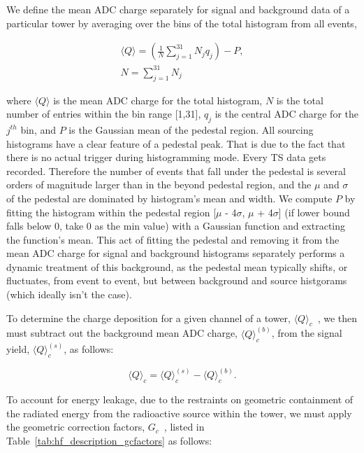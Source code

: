 We define the mean ADC charge separately for signal and background data of a
particular tower by averaging over the bins of the total histogram from all
events,

\begin{center}
   \begin{eqnarray}
      \label{eq:Histo_Avg}
      \langle{Q}\rangle = (\frac{1}{N} \sum\limits_{j=1}^{31} N_{j}q_{j}) - P, \\
      N = \sum\limits_{j=1}^{31} N_j \nonumber
   \end{eqnarray}
\end{center}

where $\langle{Q}\rangle$ is the mean ADC charge for the total histogram,
$N$ is the total number of entries within the bin range [1,31], $q_j$ is
the central ADC charge for the $j^{th}$ bin, and $P$ is the Gaussian mean of
the pedestal region. All sourcing histograms have a clear feature of a pedestal
peak. That is due to the fact that there is no actual trigger during
histogramming mode. Every TS data gets recorded. Therefore the number of events
that fall under the pedestal is several orders of magnitude larger than in the
beyond pedestal region, and the $\mu$ and $\sigma$ of the pedestal are dominated
by histogram's mean and width. We compute $P$ by fitting the histogram
within the pedestal region [$\mu$ - 4$\sigma$, $\mu$ + 4$\sigma$]
(if lower bound falls below 0, take 0 as the min value) with a Gaussian function
and extracting the function's mean. This act of fitting the pedestal
and removing it from the mean ADC charge for signal and background histograms
separately performs a dynamic treatment of this
background, as the pedestal mean typically shifts, or fluctuates, from event
to event, but between background and source histgorams (which ideally isn't the case).

To determine the charge deposition for a given channel of a tower,
${\langle{Q}\rangle}_c$~, we then must subtract out the background mean ADC
charge, ${\langle{Q}\rangle}^{(b)}_{c}$, from the signal yield,
${\langle{Q}\rangle}^{(s)}_{c}$, as follows:

\begin{center}
   \begin{equation}
      \label{eq:Sig_Min_Bkg}
      {\langle{Q}\rangle}_{c} = {\langle{Q}\rangle}^{(s)}_{c} - {\langle{Q}\rangle}^{(b)}_{c}.
   \end{equation}
\end{center}

To account for energy leakage, due to the restraints on geometric
containment of the radiated energy from the radioactive source within the tower,
we must apply the geometric correction factors, $G_c$~, listed in
Table~\ref{tab:hf_description_gcfactors} as follows:


